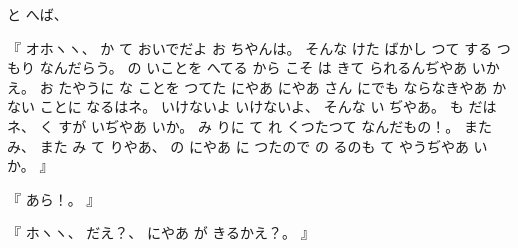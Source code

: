 %
と
へば、

%
『
オホヽヽ、
%
か
て
おいでだよ
お
ちやんは。
%
そんな
けた
ばかし
つて
する
つもり
なんだらう。
%
の
いことを
へてる
から
こそ
は
きて
られるんぢやあ
いかえ。
%
お
たやうに
な
ことを
つてた
にやあ
にやあ
さん
にでも
ならなきやあ
かない
ことに
なるはネ。
%
いけないよ
いけないよ、
%
そんな
い
ぢやあ。
%
も
だはネ、
%
く
すが
いぢやあ
いか。
%
み
りに
て
れ
くつたつて
なんだもの！。
%
また
み、
%
また
み
て
りやあ、
の
にやあ
%
に
つたので
の
るのも
て
やうぢやあ
いか。
』

%
『
あら！。
』

%
『
ホヽヽ、
%
だえ？、
%
にやあ
が
きるかえ？。
』
